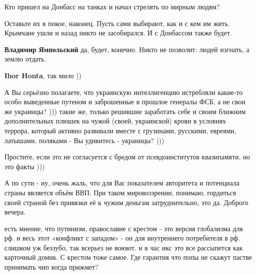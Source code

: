 \begin{itemize}
\begin{itemize}
Кто пришел на Донбасс на танках и начал стрелять по мирным людям?

Оставьте их в покое, наконец. Пусть сами выбирают, как и с кем им жить.
Крымчане ушли и назад никто не засобирался. И с Донбассом также будет.

 
\textbf{Владимир Ямпольский} да, будет, конечно. Никто не позволит: людей изгнать, а землю отдать.

 
\textbf{Ihor Honta}, так мило ))

А Вы серьёзно полагаете, что украинскую интеллигенцию истребляли какие-то особо
выведенные путеном и заброшенные в прошлое генералы ФСБ, а не свои же украинцы?
))) такие же, только решившие заработать себе и своим ближним дополнительных
плюшек на чужой (своей, украинской) крови в условиях террора, который активно
развивали вместе с грузинами, русскими, евреями, латышами, поляками - Вы
удивитесь - украинцы? )))

Простите, если это не согласуется с бредом от псевдоинститутов квазипамяти, но
это факты )))

А по сути - ну, очень жаль, что для Вас показателем авторитета и потенциала
страны является объём ВВП. При таком мировоззрении, понимаю, гордиться своей
страной без привязки её к чужим деньгам затруднительно, это да. Доброго вечера.

\end{itemize}

 

есть мнение, что путинизм, православие с крестом - это версия глобализма для
рф. и весь этот «конфликт с западом» - он для внутреннего потребителя в рф.
слишком уж беззубо, так всерьез не воюют. и в час икс это все рассыпется как
карточный домик. С крестом тоже самое. Где гарантия что попы не скажут пастве
принимать чип когда прижмет?


\end{itemize}
